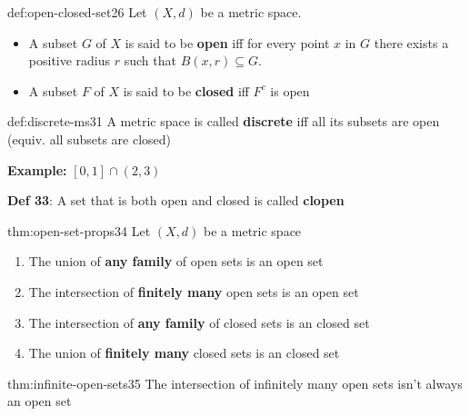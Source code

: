 \documentclass[landscape, 8pt]{extarticle}
\begin{document}
\begin{multicols}{3}
\begin{dfn}{def:open-closed-set}{26}
    \vspace{-5pt}
    Let $(X,d)$ be a metric space.
    \vspace{-5pt}
    \begin{itemize}
        \item A subset $G$ of $X$ is said to be \textbf{open} iff for every point $x$ in $G$ there exists a positive radius $r$ such that $B(x,r)\subseteq G$.
        \item A subset $F$ of $X$ is said to be \textbf{closed} iff $F^{c}$ is open
    \end{itemize}
\end{dfn}

\begin{dfn}{def:discrete-ms}{31}
    \vspace{-5pt}
    A metric space is called \textbf{discrete} iff all its subsets are open (equiv. all subsets are closed)

    \textbf{Example:} $[0,1]\cap (2,3)$

    \longrule{0.08ex}
    \textbf{Def 33}: A set that is both open and closed is called \textbf{clopen}
\end{dfn}

\vspace{-7pt}
\begin{thm}{thm:open-set-props}{34}
    \vspace{-5pt}
    Let $(X,d)$ be a metric space
    \vspace{-5pt}
    \begin{enumerate}
        \item The union of \textbf{any family} of open sets is an open set
        \item The intersection of \textbf{finitely many} open sets is an open set
        \item The intersection of \textbf{any family} of closed sets is an closed set
        \item The union of \textbf{finitely many} closed sets is an closed set
    \end{enumerate}
\end{thm}

\vspace{-7pt}
\begin{rem}{thm:infinite-open-sets}{35}
    \vspace{-5pt}
    The intersection of infinitely many open sets isn't always an open set
    

\end{rem}
\end{multicols}
\end{document}
